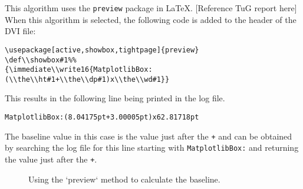 \documentclass[]{article}
\begin{document}
This algorithm uses the \texttt{preview} package in \LaTeX{}.
{[}Reference TuG report here{]} When this algorithm is selected, the
following code is added to the header of the DVI file:

\begin{verbatim}
\usepackage[active,showbox,tightpage]{preview}
\def\\showbox#1%%
{\immediate\\write16{MatplotlibBox:(\\the\\ht#1+\\the\\dp#1)x\\the\\wd#1}}
\end{verbatim}

This results in the following line being printed in the log file.

\begin{verbatim}
MatplotlibBox:(8.04175pt+3.00005pt)x62.81718pt
\end{verbatim}

The baseline value in this case is the value just after the \texttt{+}
and can be obtained by searching the log file for this line starting
with \texttt{MatplotlibBox:} and returning the value just after the
\texttt{+}.

\begin{figure}
\begin{adjustwidth}{0.5in}{0in}
 \vspace{0.3cm}
 \vspace{0.3cm}
 \vspace{0.3cm}
 \vspace{0.3cm}
 \vspace{0.3cm}
 \vspace{0.3cm}
 \vspace{0.3cm}
 \vspace{0.3cm}
 \vspace{0.3cm}
 \vspace{0.3cm}
 \vspace{0.3cm}
 \vspace{0.3cm}
 \end{adjustwidth}
\caption{Using the `preview` method to calculate the baseline.}
\end{figure}
\end{document}
